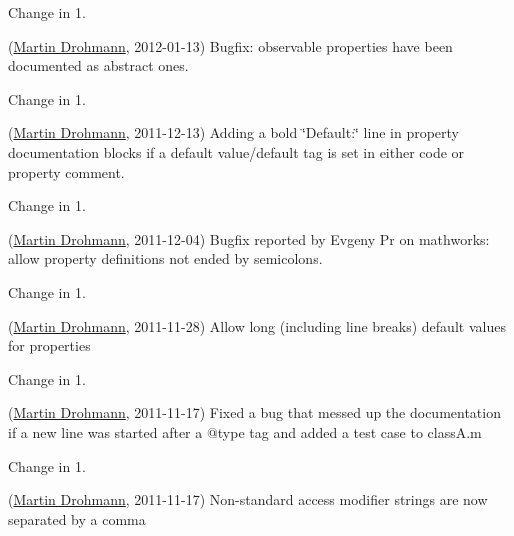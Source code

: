 \begin{DoxyRefDesc}{Change in 1.}
\item[\hyperlink{changelog1_3__changelog1_3000018}{Change in 1.\+3}](\hyperlink{developers_md}{Martin Drohmann}, 2012-\/01-\/13) Bugfix\+: observable properties have been documented as abstract ones.\end{DoxyRefDesc}


\begin{DoxyRefDesc}{Change in 1.}
\item[\hyperlink{changelog1_3__changelog1_3000019}{Change in 1.\+3}](\hyperlink{developers_md}{Martin Drohmann}, 2011-\/12-\/13) Adding a bold \char`\"{}\+Default\+:\char`\"{} line in property documentation blocks if a default value/default tag is set in either code or property comment.\end{DoxyRefDesc}


\begin{DoxyRefDesc}{Change in 1.}
\item[\hyperlink{changelog1_3__changelog1_3000020}{Change in 1.\+3}](\hyperlink{developers_md}{Martin Drohmann}, 2011-\/12-\/04) Bugfix reported by Evgeny Pr on mathworks\+: allow property definitions not ended by semicolons.\end{DoxyRefDesc}


\begin{DoxyRefDesc}{Change in 1.}
\item[\hyperlink{changelog1_2__changelog1_2000005}{Change in 1.\+2}](\hyperlink{developers_md}{Martin Drohmann}, 2011-\/11-\/28) Allow long (including line breaks) default values for properties\end{DoxyRefDesc}


\begin{DoxyRefDesc}{Change in 1.}
\item[\hyperlink{changelog1_2__changelog1_2000006}{Change in 1.\+2}](\hyperlink{developers_md}{Martin Drohmann}, 2011-\/11-\/17) Fixed a bug that messed up the documentation if a new line was started after a @type tag and added a test case to class\+A.\+m\end{DoxyRefDesc}


\begin{DoxyRefDesc}{Change in 1.}
\item[\hyperlink{changelog1_2__changelog1_2000007}{Change in 1.\+2}](\hyperlink{developers_md}{Martin Drohmann}, 2011-\/11-\/17) Non-\/standard access modifier strings are now separated by a comma\end{DoxyRefDesc}


